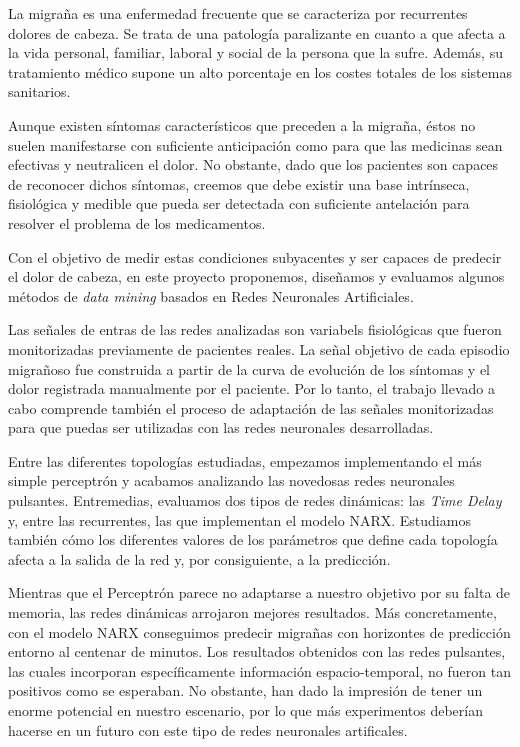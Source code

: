 
\thispagestyle{empty}  

La migraña es una enfermedad frecuente que se caracteriza por recurrentes dolores de cabeza. Se trata de una patología paralizante en cuanto a que afecta a la vida personal, familiar, laboral y social de la persona que la sufre. Además, su tratamiento médico supone un alto porcentaje en los costes totales de los sistemas sanitarios.

Aunque existen síntomas característicos que preceden a la migraña, éstos no suelen manifestarse con suficiente anticipación como para que las medicinas sean efectivas y neutralicen el dolor. No obstante, dado que los pacientes son capaces de reconocer dichos síntomas, creemos que debe existir una base intrínseca, fisiológica y medible que pueda ser detectada con suficiente antelación para resolver el problema de los medicamentos.

Con el objetivo de medir estas condiciones subyacentes y ser capaces de predecir el dolor de cabeza, en este proyecto proponemos, diseñamos y evaluamos algunos métodos de \emph{data mining} basados en Redes Neuronales Artificiales.

Las señales de entras de las redes analizadas son variabels fisiológicas que fueron monitorizadas previamente de pacientes reales. La señal objetivo de cada episodio migrañoso fue construida a partir de la curva de evolución de los síntomas y el dolor registrada manualmente por el paciente. Por lo tanto, el trabajo llevado a cabo comprende también el proceso de adaptación de las señales monitorizadas para que puedas ser utilizadas con las redes neuronales desarrolladas.

Entre las diferentes topologías estudiadas, empezamos implementando el más simple perceptrón y acabamos analizando las novedosas redes neuronales pulsantes. Entremedias, evaluamos dos tipos de redes dinámicas: las \emph{Time Delay} y, entre las recurrentes, las que implementan el modelo NARX. Estudiamos también cómo los diferentes valores de los parámetros que define cada topología afecta a la salida de la red y, por consiguiente, a la predicción.

Mientras que el Perceptrón parece no adaptarse a nuestro objetivo por su falta de memoria, las redes dinámicas arrojaron mejores resultados. Más concretamente, con el modelo NARX conseguimos predecir migrañas con horizontes de predicción entorno al centenar de minutos.
Los resultados obtenidos con las redes pulsantes, las cuales incorporan específicamente información espacio-temporal, no fueron tan positivos como se esperaban. No obstante, han dado la impresión de tener un enorme potencial en nuestro escenario, por lo que más experimentos deberían hacerse en un futuro con este tipo de redes neuronales artificales.

